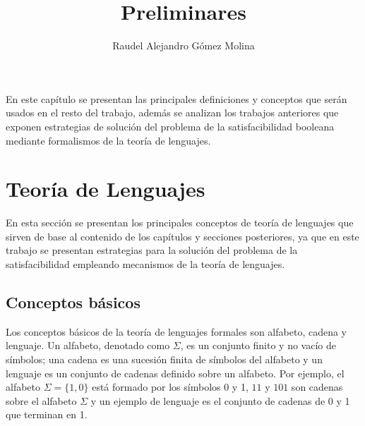 \documentclass[12pt]{article}
\title{Preliminares}
\author{Raudel Alejandro Gómez Molina}
\begin{document}
\maketitle





En este capítulo se presentan las principales definiciones y conceptos que serán usados en el resto del trabajo, además
se analizan los trabajos anteriores que exponen estrategias de solución del problema de la satisfacibilidad
booleana  mediante formalismos de la teoría de lenguajes.

\section{Teoría de Lenguajes}

En esta sección se presentan los principales conceptos de teoría de lenguajes que sirven de base al contenido de los 
capítulos y secciones posteriores, ya que en este trabajo se presentan estrategias para la solución del problema
de la satisfacibilidad empleando mecanismos de la teoría de lenguajes.

\subsection{Conceptos básicos}

Los conceptos básicos de la teoría de lenguajes formales son alfabeto, cadena y lenguaje. Un alfabeto, denotado 
como $\Sigma$, es un conjunto finito y no vacío de símbolos; una cadena es una sucesión finita de símbolos del alfabeto y 
un lenguaje es un conjunto de cadenas definido sobre un alfabeto. Por ejemplo, el 
alfabeto $\Sigma=\{1,0\}$ está formado por los símbolos 0 y 1, $11$ y $101$ son cadenas sobre el alfabeto $\Sigma$ y un ejemplo de lenguaje
es  el conjunto de cadenas de 0 y 1 que terminan en 1.
\end{document}
